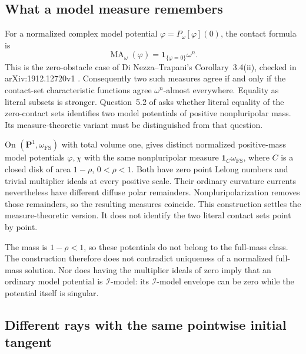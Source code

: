 \subsection{What a model measure remembers}

For a normalized complex model potential $\varphi=P_\omega[\varphi](0)$,
the contact formula is
\[
\tag{65.62}\label{eq:rf-survey-contact-measure}
 \operatorname{MA}_\omega(\varphi)
       =\mathbf1_{\{\varphi=0\}}\omega^n.
\]
This is the zero-obstacle case of Di Nezza--Trapani's
Corollary~3.4(ii), checked in arXiv:1912.12720v1
\cite{DNT19ContactV1}. Consequently two such measures agree
if and only if the contact-set characteristic functions agree
$\omega^n$-almost everywhere. Equality as literal subsets is
stronger. Question~5.2 of \cite{Darvas26MetricSurveyV2} asks
whether literal equality of the zero-contact sets identifies
two model potentials of positive nonpluripolar mass. Its
measure-theoretic variant must be distinguished from that question.

On $(\mathbf P^1,\omega_{\mathrm{FS}})$ with total volume one,
\cite[Theorem~4.1]{Xiao26NonuniquenessV1} gives distinct
normalized positive-mass model potentials $\varphi,\chi$ with
the same nonpluripolar measure
$\mathbf1_C\omega_{\mathrm{FS}}$, where $C$ is a closed disk
of area $1-\rho$, $0<\rho<1$. Both have zero point Lelong
numbers and trivial multiplier ideals at every positive scale.
Their ordinary curvature currents nevertheless have different
diffuse polar remainders. Nonpluripolarization removes those
remainders, so the resulting measures coincide. This construction
settles the measure-theoretic version. It does not identify the
two literal contact sets point by point.

The mass is $1-\rho<1$, so these potentials do not belong to
the full-mass class. The construction therefore does not
contradict uniqueness of a normalized full-mass solution.
Nor does having the multiplier ideals of zero imply that an
ordinary model potential is $\mathcal I$-model: its
$\mathcal I$-model envelope can be zero while the potential
itself is singular.

\subsection{Different rays with the same pointwise initial tangent}

